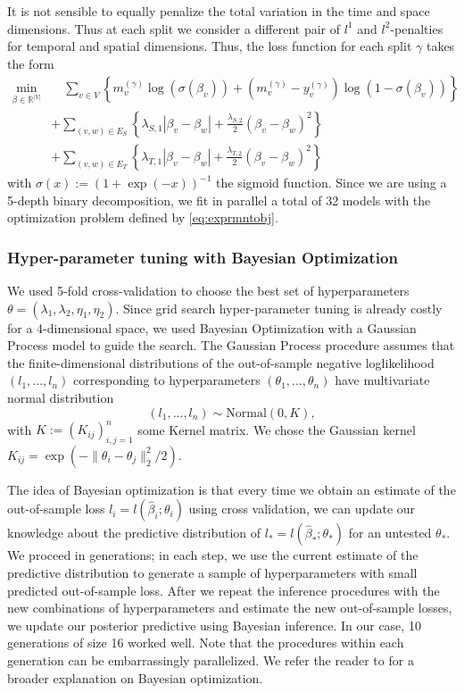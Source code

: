 \documentclass[11pt]{article}
\begin{document}
It is not sensible to equally penalize the total variation in the time and space dimensions. Thus at each split we consider a different pair of $l^1$ and $l^2$-penalties for temporal and spatial dimensions. Thus, the loss function for each split $\gamma$ takes the form
\begin{equation}
\begin{aligned}
\min_{\beta \in \mathbb{R}^{|V|}} & \quad \sum_{v \in V} \left\{ m_v^{(\gamma)} \log(\sigma(\beta_v)) + (m_v^{(\gamma)} - y_v^{(\gamma)})\log(1 - \sigma(\beta_v)) \right\} \\
 & + \sum_{(v,w) \in E_S} \left\{ \lambda_{S,1} \left|\beta_v -\beta_w\right|  
 + \frac{\lambda_{S,2}}{2} \left(\beta_v -\beta_w\right)^2 \right\} \\
 & + \sum_{(v,w) \in E_T} \left\{ \lambda_{T,1} \left|\beta_v -\beta_w\right|  
  + \frac{\lambda_{T,2}}{2} \left(\beta_v -\beta_w\right)^2 \right\}
\end{aligned}
\label{eq:exprmntobj} 
\end{equation}
with $\sigma(x) := (1 + \exp(-x))^{-1}$ the sigmoid function. Since we are using a 5-depth binary decomposition, we fit in parallel a total of 32 models with the optimization problem defined by \eqref{eq:exprmntobj}.

\subsubsection{Hyper-parameter tuning with Bayesian Optimization}

We used 5-fold cross-validation to choose the best set of hyperparameters $\theta=(\lambda_1, \lambda_2, \eta_1, \eta_2)$. Since grid search hyper-parameter tuning is already costly for a 4-dimensional space, we used Bayesian Optimization \citep{snoek-etal-2012} with a Gaussian Process model to guide the search. The Gaussian Process procedure  assumes that the finite-dimensional distributions of the out-of-sample negative loglikelihood $(l_1,...,l_n)$ corresponding to hyperparameters $(\theta_1,...,\theta_n)$ have multivariate normal distribution
$$
(l_1,...,l_n)  \sim \mathrm{Normal}(0, K), 
$$
with $K:=(K_{ij})_{i,j=1}^n$ some Kernel matrix. We chose the Gaussian kernel $K_{ij}=\exp(-\lVert \theta_i - \theta_j\rVert^2_2/2)$.

The idea of Bayesian optimization is that every time we obtain an estimate of the out-of-sample loss $l_i=l(\hat{\beta}_i; \theta_i)$ using cross validation, we can update our knowledge about the predictive distribution of $l_* = l(\hat{\beta}_*; \theta_*)$ for an untested $\theta_*$. We proceed in generations; in each step, we use the current estimate of the predictive distribution to generate a sample of hyperparameters with small predicted out-of-sample loss. After we repeat the inference procedures with the new combinations of hyperparameters and estimate the new out-of-sample losses, we update our posterior predictive using Bayesian inference. In our case, 10 generations of size 16 worked well. Note that the procedures within each generation can be embarrassingly parallelized. We refer the reader to \citep{shahriari-etal-2016} for a broader explanation on Bayesian optimization.
\end{document}
